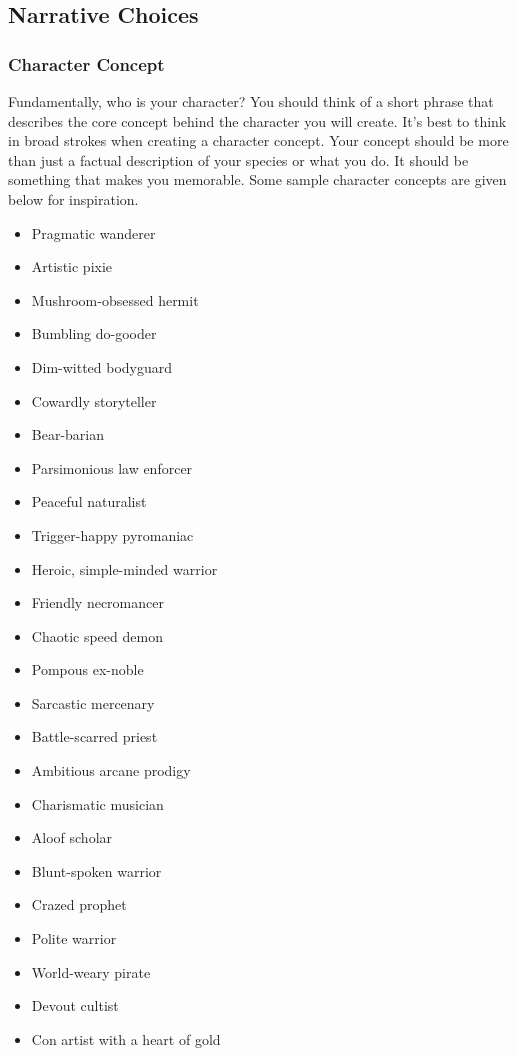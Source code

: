     \subsection{Narrative Choices}

        \subsubsection{Character Concept}

            Fundamentally, who is your character?
            You should think of a short phrase that describes the core concept behind the character you will create.
            It's best to think in broad strokes when creating a character concept.
            Your concept should be more than just a factual description of your species or what you do.
            It should be something that makes you memorable.
            Some sample character concepts are given below for inspiration.

            \begin{itemize}
                \item Pragmatic wanderer
                \item Artistic pixie
                \item Mushroom-obsessed hermit
                \item Bumbling do-gooder
                \item Dim-witted bodyguard
                \item Cowardly storyteller
                \item Bear-barian
                \item Parsimonious law enforcer
                \item Peaceful naturalist
                \item Trigger-happy pyromaniac
                \item Heroic, simple-minded warrior
                \item Friendly necromancer
                \item Chaotic speed demon
                \item Pompous ex-noble
                \item Sarcastic mercenary
                \item Battle-scarred priest
                \item Ambitious arcane prodigy
                \item Charismatic musician
                \item Aloof scholar
                \item Blunt-spoken warrior
                \item Crazed prophet
                \item Polite warrior
                \item World-weary pirate
                \item Devout cultist
                \item Con artist with a heart of gold
            \end{itemize}

